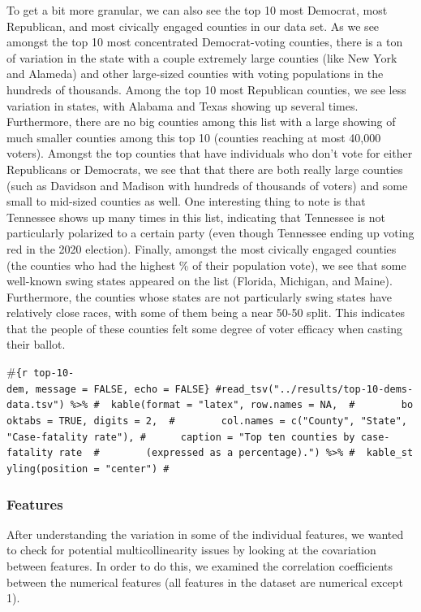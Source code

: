\documentclass[
]{article}
\begin{document}
To get a bit more granular, we can also see the top 10 most Democrat, most Republican, and most civically engaged counties in our data set. As we see amongst the top 10 most concentrated Democrat-voting counties, there is a ton of variation in the state with a couple extremely large counties (like New York and Alameda) and other large-sized counties with voting populations in the hundreds of thousands. Among the top 10 most Republican counties, we see less variation in states, with Alabama and Texas showing up several times. Furthermore, there are no big counties among this list with a large showing of much smaller counties among this top 10 (counties reaching at most 40,000 voters). Amongst the top counties that have individuals who don't vote for either Republicans or Democrats, we see that that there are both really large counties (such as Davidson and Madison with hundreds of thousands of voters) and some small to mid-sized counties as well. One interesting thing to note is that Tennessee shows up many times in this list, indicating that Tennessee is not particularly polarized to a certain party (even though Tennessee ending up voting red in the 2020 election). Finally, amongst the most civically engaged counties (the counties who had the highest \% of their population vote), we see that some well-known swing states appeared on the list (Florida, Michigan, and Maine). Furthermore, the counties whose states are not particularly swing states have relatively close races, with some of them being a near 50-50 split. This indicates that the people of these counties felt some degree of voter efficacy when casting their ballot.

\#\texttt{\{r\ top-10-dem,\ message\ =\ FALSE,\ echo\ =\ FALSE\}\ \#read\_tsv("../results/top-10-dems-data.tsv")\ \%\textgreater{}\%\ \#\ \ kable(format\ =\ "latex",\ row.names\ =\ NA,\ \ \#\ \ \ \ \ \ \ \ booktabs\ =\ TRUE,\ digits\ =\ 2,\ \ \#\ \ \ \ \ \ \ \ col.names\ =\ c("County",\ "State",\ "Case-fatality\ rate"),\ \#\ \ \ \ \ \ caption\ =\ "Top\ ten\ counties\ by\ case-fatality\ rate\ \ \#\ \ \ \ \ \ \ \ (expressed\ as\ a\ percentage).")\ \%\textgreater{}\%\ \#\ \ kable\_styling(position\ =\ "center")\ \#}

\hypertarget{features-1}{%
\subsubsection{Features}\label{features-1}}

After understanding the variation in some of the individual features, we wanted to check for potential multicollinearity issues by looking at the covariation between features. In order to do this, we examined the correlation coefficients between the numerical features (all features in the dataset are numerical except 1).
\end{document}
